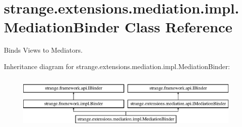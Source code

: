 \hypertarget{classstrange_1_1extensions_1_1mediation_1_1impl_1_1_mediation_binder}{\section{strange.\-extensions.\-mediation.\-impl.\-Mediation\-Binder Class Reference}
\label{classstrange_1_1extensions_1_1mediation_1_1impl_1_1_mediation_binder}
}


Binds Views to Mediators.  


Inheritance diagram for strange.\-extensions.\-mediation.\-impl.\-Mediation\-Binder\-:\begin{figure}[H]
\begin{center}
\leavevmode
\includegraphics[height=2.763158cm]{classstrange_1_1extensions_1_1mediation_1_1impl_1_1_mediation_binder}
\end{center}
\end{figure}
